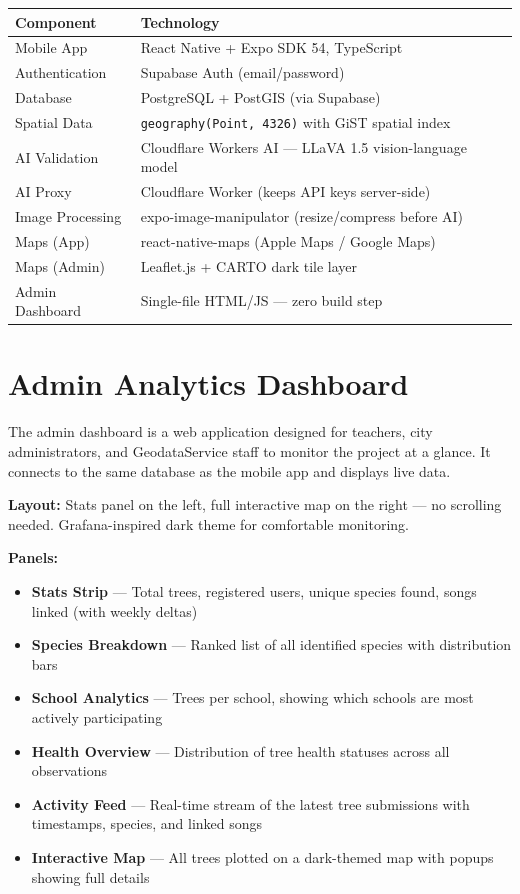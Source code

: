 \documentclass[11pt,a4paper]{article}
\begin{document}
\begin{center}
\begin{tabularx}{\textwidth}{l X}
\toprule
\textbf{Component} & \textbf{Technology} \\
\midrule
Mobile App & React Native + Expo SDK 54, TypeScript \\
Authentication & Supabase Auth (email/password) \\
Database & PostgreSQL + PostGIS (via Supabase) \\
Spatial Data & \texttt{geography(Point, 4326)} with GiST spatial index \\
AI Validation & Cloudflare Workers AI --- LLaVA 1.5 vision-language model \\
AI Proxy & Cloudflare Worker (keeps API keys server-side) \\
Image Processing & expo-image-manipulator (resize/compress before AI) \\
Maps (App) & react-native-maps (Apple Maps / Google Maps) \\
Maps (Admin) & Leaflet.js + CARTO dark tile layer \\
Admin Dashboard & Single-file HTML/JS --- zero build step \\
\bottomrule
\end{tabularx}
\end{center}

\section{Admin Analytics Dashboard}

The admin dashboard is a web application designed for teachers, city administrators, and GeodataService staff to monitor the project at a glance. It connects to the same database as the mobile app and displays live data.

\textbf{Layout:} Stats panel on the left, full interactive map on the right --- no scrolling needed. Grafana-inspired dark theme for comfortable monitoring.

\textbf{Panels:}
\begin{itemize}[nosep]
  \item \textbf{Stats Strip} --- Total trees, registered users, unique species found, songs linked (with weekly deltas)
  \item \textbf{Species Breakdown} --- Ranked list of all identified species with distribution bars
  \item \textbf{School Analytics} --- Trees per school, showing which schools are most actively participating
  \item \textbf{Health Overview} --- Distribution of tree health statuses across all observations
  \item \textbf{Activity Feed} --- Real-time stream of the latest tree submissions with timestamps, species, and linked songs
  \item \textbf{Interactive Map} --- All trees plotted on a dark-themed map with popups showing full details
\end{itemize}
\end{document}
